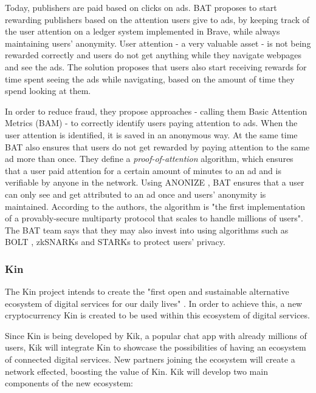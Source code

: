 \medskip

Today, publishers are paid based on clicks on ads. BAT proposes to start rewarding publishers based on the attention users give to ads, by keeping track of the user attention on a ledger system implemented in Brave, while always maintaining users' anonymity. User attention - a very valuable asset - is not being rewarded correctly and users do not get anything while they navigate webpages and see the ads. The solution proposes that users also start receiving rewards for time spent seeing the ads while navigating, based on the amount of time they spend looking at them.

\medskip

In order to reduce fraud, they propose approaches - calling them Basic Attention Metrics (BAM) - to correctly identify users paying attention to ads. When the user attention is identified, it is saved in an anonymous way. At the same time BAT also ensures that users do not get rewarded by paying attention to the same ad more than once. They define a \textit{proof-of-attention} algorithm, which ensures that a user paid attention for a certain amount of minutes to an ad and is verifiable by anyone in the network. Using \textsf{ANONIZE} \cite{ANONIZE}, BAT ensures that a user can only see and get attributed to an ad once and users' anonymity is maintained. According to the authors, the algorithm is "the first implementation of a provably-secure multiparty protocol that scales to handle millions of users".  The BAT team says that they may also invest into using algorithms such as BOLT \cite{Bolt}, zkSNARKs \cite{ZKSNARK} and STARKs \cite{STARK} to protect users' privacy.

\subsubsection{Kin}

The Kin project intends to create the "first open and sustainable alternative ecosystem of digital services for our daily lives" \cite{KIN}. In order to achieve this, a new cryptocurrency Kin is created to be used within this ecosystem of digital services.

\medskip

Since Kin is being developed by Kik, a popular chat app with already millions of users, Kik will integrate Kin to showcase the possibilities of having an ecosystem of connected digital services. New partners joining the ecosystem will create a network effected, boosting the value of Kin. Kik will develop two main components of the new ecosystem:

